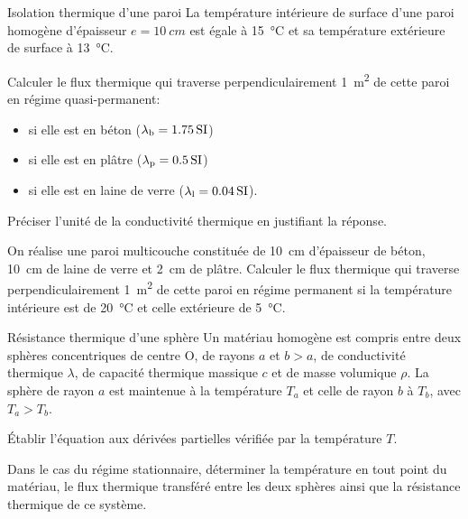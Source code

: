 \begin{exo}[PC][2]{Isolation thermique d'une paroi}
La température intérieure de surface d'une paroi homogène d'épaisseur $e=\SI{10}{cm}$ est égale à \SI{15}{\celsius} et sa température extérieure de surface à \SI{13}{\celsius}.
\begin{quest}
\item Calculer le flux thermique qui traverse perpendiculairement \SI{1}{m^2} de cette paroi en régime quasi-permanent:
\begin{itemize}
\item si elle est en béton ($\lambda_{\rm{b}}=\SI{1,75}{SI}$)
\item si elle est en plâtre ($\lambda_{\rm{p}}=\SI{0,5}{SI}$)
\item si elle est en laine de verre ($\lambda_{\rm{l}}=\SI{0,04}{SI}$).
\end{itemize}
Préciser l'unité de la conductivité thermique en justifiant la réponse.
\item On réalise une paroi multicouche constituée de \SI{10}{cm} d'épaisseur de béton, \SI{10}{cm} de laine de verre et \SI{2}{cm} de plâtre. Calculer le flux thermique qui traverse perpendiculairement \SI{1}{m^2} de cette paroi en régime permanent si la température intérieure est de \SI{20}{\celsius} et celle extérieure de \SI{5}{\celsius}.
\end{quest}
\end{exo}

\begin{exo}[PC][1]{Résistance thermique d'une sphère}
Un matériau homogène est compris entre deux sphères concentriques de centre O, de rayons $a$ et $b>a$, de conductivité thermique $\lambda$, de capacité thermique massique $c$ et de masse volumique $\rho$. La sphère de rayon $a$ est maintenue à la température $T_a$ et celle de rayon $b$ à $T_b$, avec $T_a>T_b$.
\begin{quest}
\item Établir l'équation aux dérivées partielles vérifiée par la température $T$.
\item Dans le cas du régime stationnaire, déterminer la température en tout point du matériau, le flux thermique transféré entre les deux sphères ainsi que la résistance thermique de ce système.
\end{quest}
\end{exo}

